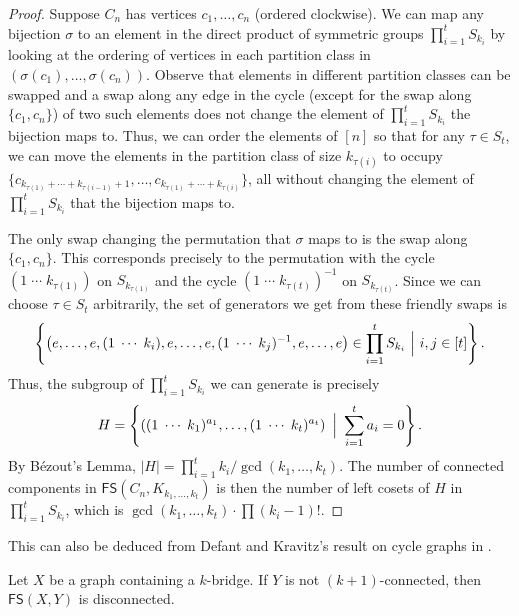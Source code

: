\documentclass{mystyle}
\newcommand{\FS}{\mathsf{FS}}
\begin{document}
\begin{proof}
    Suppose $C_n$ has vertices $c_1, \ldots, c_n$ (ordered clockwise). We can map any bijection $\sigma$ to an element in the direct product of symmetric groups $\prod_{i = 1}^t S_{k_i}$ by looking at the ordering of vertices in each partition class in $(\sigma(c_1), \ldots, \sigma(c_n))$. Observe that elements in different partition classes can be swapped and a swap along any edge in the cycle (except for the swap along $\{c_1, c_n\}$) of two such elements does not change the element of $\prod_{i = 1}^t S_{k_i}$ the bijection maps to. Thus, we can order the elements of $[n]$ so that for any $\tau \in S_t$, we can move the elements in the partition class of size $k_{\tau(i)}$ to occupy $\{c_{k_{\tau(1)} + \cdots + k_{\tau(i-1)} + 1}, \ldots, c_{k_{\tau(1)} + \cdots + k_{\tau(i)}}\}$, all without changing the element of $\prod_{i = 1}^t S_{k_i}$ that the bijection maps to. 

    The only swap changing the permutation that $\sigma$ maps to is the swap along $\{c_1, c_n\}$. This corresponds precisely to the permutation with the cycle $(1 \; \cdots \; k_{\tau(1)})$ on $S_{k_{\tau(1)}}$ and the cycle $(1 \; \cdots \; k_{\tau(t)})^{-1}$ on $S_{k_{\tau(t)}}$. Since we can choose $\tau \in S_t$ arbitrarily, the set of generators we get from these friendly swaps is 
    \[
        \left\{\left(e, \ldots, e, (1 \; \cdots \; k_{i}), e, \ldots, e, (1 \; \cdots \; k_{j})^{-1}, e, \ldots, e \right) \in \prod_{i = 1}^t S_{k_i} \ \Big{|} \ i, j \in [t] \right\}.
    \]
    Thus, the subgroup of $\prod_{i = 1}^t S_{k_i}$ we can generate is precisely 
    \[
        H = \left\{ \left( (1 \; \cdots \; k_{1})^{a_1}, \ldots, (1 \; \cdots \; k_{t})^{a_t} \right) \ \Big{|} \ \sum_{i = 1}^{t} a_i = 0 \right\}.
    \]
    By B\'ezout's Lemma, $|H| = \prod_{i = 1}^{t} k_i / \gcd(k_1, \ldots, k_t)$. The number of connected components in $\FS(C_n, K_{k_1, \ldots, k_t})$ is then the number of left cosets of $H$ in $\prod_{i = 1}^t S_{k_i}$, which is $\gcd(k_1, \ldots, k_t) \cdot \prod (k_i - 1)!$.
\end{proof}
This can also be deduced from Defant and Kravitz's result on cycle graphs in \cite{defant2021}.

\begin{lemma}\label{lem_k_bridge_disconnected}
    Let $X$ be a graph containing a $k$-bridge. If $Y$ is not $(k + 1)$-connected, then $\FS(X, Y)$ is disconnected. 
\end{lemma}
\end{document}

